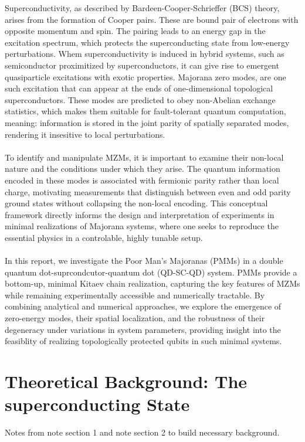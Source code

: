 \documentclass[11pt, letterpaper, titlepage]{article}
\begin{document}
Superconductivity, as described by Bardeen-Cooper-Schrieffer (BCS) theory, arises from the formation of Cooper pairs. These are bound pair of electrons with opposite momentum and spin. The pairing leads to an energy gap in the excitation spectrum, which protects the superconducting state from low-energy perturbations. Whem superconductivity is induced in hybrid systems, such as semiconductor proximitized by superconductors, it can give rise to emergent quasiparticle excitations with exotic properties. Majorana zero modes, are one such excitation that can appear at the ends of one-dimensional topological superconductors. These modes are predicted to obey non-Abelian exchange statistics, which makes them suitable for fault-tolerant quantum computation, meaning: information is stored in the joint parity of spatially separated modes, rendering it insesitive to local perturbations.\\ \\
To identify and manipulate MZMs, it is important to examine their non-local nature and the conditions under which they arise. The quantum information encoded in these modes is associated with fermionic parity rather than local charge, motivating measurements that distinguish between even and odd parity ground states without collapsing the non-local encoding. This conceptual framework directly informs the design and interpretation of experiments in minimal realizations of Majorana systems, where one seeks to reproduce the essential physics in a controlable, highly tunable setup. \\ \\
In this report, we investigate the Poor Man's Majoranas (PMMs) in a double quantum dot-suprcondcutor-quantum dot (QD-SC-QD) system. PMMs provide a bottom-up, minimal Kitaev chain realization, capturing the key features of MZMs while remaining experimentally accessible and numerically tractable. By combining analytical and numerical approaches, we explore the emergence of zero-energy modes, their spatial localization, and the robustness of their degeneracy under variations in system parameters, providing insight into the feasiblity of realizing topologically protected qubits in such minimal systems.\\

\section{Theoretical Background: The superconducting State}
Notes from note section 1 and note section 2 to build necessary background.\par
\end{document}
